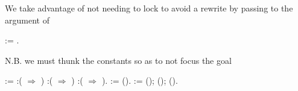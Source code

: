 We take advantage of not needing to lock  to avoid a
    rewrite by passing  to the  argument of
     \begin{coqdoccode}
\coqdocemptyline
\coqdocnoindent
{}  \coqdocvar{\_} :=     .\coqdoceol
\coqdocemptyline
\end{coqdoccode}
N.B. we must thunk the constants so as to not focus the goal \begin{coqdoccode}
\coqdocemptyline
\coqdocnoindent
{}  \coqdocvar{\_} :=  :( \coqdocvar{\_} \ensuremath{\Rightarrow} )\coqdoceol
\coqdocindent{20.50em}
:( \coqdocvar{\_} \ensuremath{\Rightarrow} )\coqdoceol
\coqdocindent{20.50em}
:(  \ensuremath{\Rightarrow} ).\coqdoceol
\coqdocnoindent
{}  \coqdocvar{\_} :=  ().\coqdoceol
\coqdocnoindent
{}  \coqdocvar{\_} :=  ();  ();  ().\coqdoceol
\end{coqdoccode}
